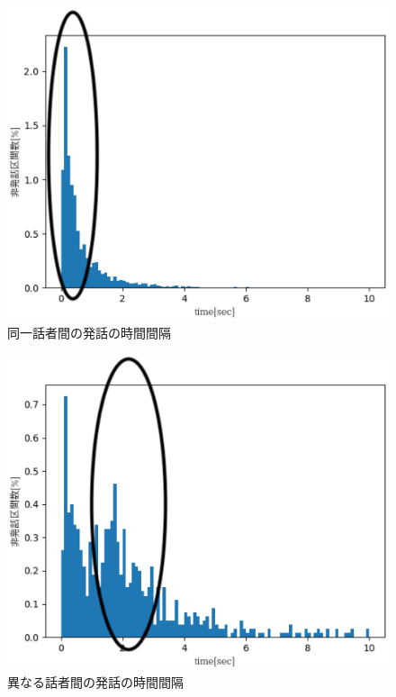 \begin{figure}[H]
  \begin{center}
    \includegraphics{./figure/pre_same1.eps}
  \end{center}
  \caption{同一話者間の発話の時間間隔 \label{fig:same_sp}}
\end{figure}

\begin{figure}[H]
  \begin{center}
    \includegraphics{./figure/pre_other2.eps}
  \end{center}
  \caption{異なる話者間の発話の時間間隔 \label{fig:different_sp}}
\end{figure}

